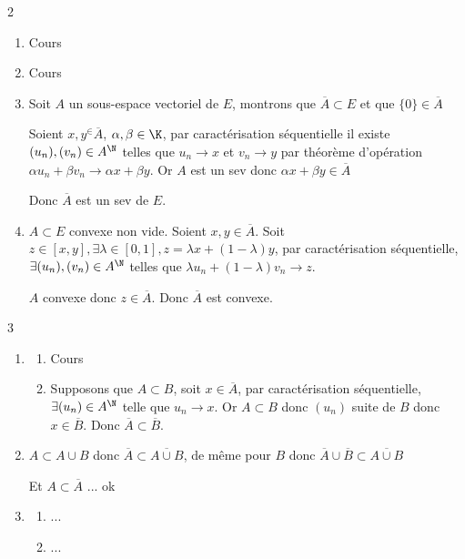 \begin{correction}{2}
\begin{enumerate}
    \item Cours
    \item Cours
    
    \item Soit $A$ un sous-espace vectoriel de $E$, montrons que $\overline{A} \subset E$ et que $\{0\} \in \overline{A}$

    Soient $x,y^\in \overline{A}$, $\alpha,\beta \in \K$, par caractérisation séquentielle il existe $(u_n),(v_n) \in A^{\N}$ telles que $u_n \to x$ et $v_n \to y$
    par théorème d'opération $\alpha u_n + \beta v_n \to \alpha x + \beta y$. Or $A$ est un sev donc $\alpha x + \beta y \in \overline{A}$

    Donc $\overline{A}$ est un sev de $E$.
    
    \item $A \subset E$ convexe non vide. Soient $x,y \in \overline{A}$. Soit $z \in [x,y], \exists \lambda \in [0,1], z = \lambda x + (1 - \lambda)y$,
    par caractérisation séquentielle, $\exists (u_n),(v_n) \in A^{\N}$ telles que $\lambda u_n + (1 - \lambda) v_n \to z$.
    
    $A$ convexe donc $z \in \overline{A}$. Donc $\overline{A}$ est convexe.
\end{enumerate}
\end{correction}

\begin{correction}{3}
\begin{enumerate}
    \item
    \begin{enumerate}
        \item Cours
        \item Supposons que $A \subset B$, soit $x \in \overline{A}$, par caractérisation séquentielle, $\exists (u_n) \in A^{\N}$ telle que $u_n \to x$.
        Or $A \subset B$ donc $(u_n)$ suite de $B$ donc $x \in \overline{B}$. Donc $\overline{A} \subset \overline{B}$.
    \end{enumerate}

    \item $A \subset A \cup B$
    donc $\overline{A} \subset \overline{A \cup B}$, de même pour $B$
    donc $\overline{A} \cup \overline{B} \subset \overline{A \cup B}$

    Et $A \subset \overline A$ ... ok

    \item
    \begin{enumerate}
        \item ...
        \item ...
    \end{enumerate}
\end{enumerate}
\end{correction}

